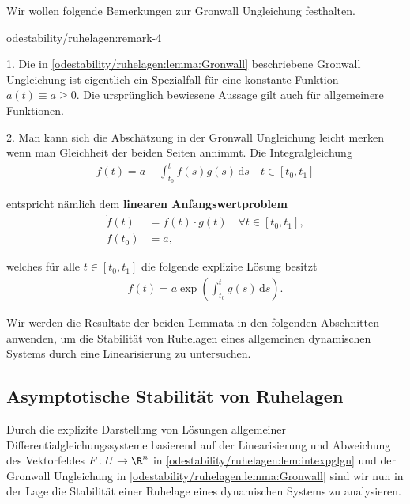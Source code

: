 \documentclass[letterpaper,10pt,german]{jupyterBook}
\begin{document}
\par
Wir wollen folgende Bemerkungen zur Gronwall Ungleichung festhalten.
\begin{remark}{}{odestability/ruhelagen:remark-4}



\par
1. Die in \cref{odestability/ruhelagen:lemma:Gronwall} beschriebene Gronwall Ungleichung ist eigentlich ein Spezialfall für eine konstante Funktion \(a(t) \equiv a \geq 0\).
Die ursprünglich bewiesene Aussage gilt auch für allgemeinere Funktionen.

\par
2. Man kann sich die Abschätzung in der Gronwall Ungleichung leicht merken wenn man Gleichheit der beiden Seiten annimmt.
Die Integralgleichung
\begin{align*}
f(t) = a + \int_{t_0}^t f(s)g(s)\, \mathrm{d}s \quad t\in [t_0,t_1]
\end{align*}
\par
entspricht nämlich dem \textbf{linearen Anfangswertproblem}
\begin{align*}
\dot{f}(t) &= f(t)\cdot g(t) \quad \forall t \in [t_0, t_1], \\
f(t_0) &= a,
\end{align*}
\par
welches für alle \(t \in [t_0, t_1]\) die folgende explizite Lösung besitzt
\begin{align*}
f(t) = a \exp{\left( \int_{t_0}^t g(s)\, \mathrm{d}s \right)}.
\end{align*}\end{remark}

\par
Wir werden die Resultate der beiden Lemmata in den folgenden Abschnitten anwenden, um die Stabilität von Ruhelagen eines allgemeinen dynamischen Systems durch eine Linearisierung zu untersuchen.


\subsection{Asymptotische Stabilität von Ruhelagen}
\label{\detokenize{odestability/ruhelagen:asymptotische-stabilitat-von-ruhelagen}}
\par
Durch die explizite Darstellung von Lösungen allgemeiner Differentialgleichungssysteme basierend auf der Linearisierung und Abweichung des Vektorfeldes \(F \colon U \rightarrow \R^n\) in \cref{odestability/ruhelagen:lem:intexpglgn} und der Gronwall Ungleichung in \cref{odestability/ruhelagen:lemma:Gronwall} sind wir nun in der Lage die Stabilität einer Ruhelage eines dynamischen Systems zu analysieren.
\end{document}
